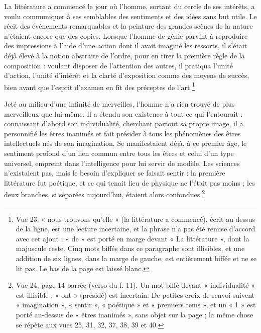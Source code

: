 \documentclass[11pt,a4paper]{article}
\begin{document}
La littérature a commencé le jour où l'homme, sortant du cercle de ses
intérêts, a voulu communiquer à ses semblables des sentiments et des idées sans
but utile. Le récit des événements remarquables et la peinture des grandes
scènes de la nature n'étaient encore que des copies. Lorsque l'homme de génie
parvint à reproduire des impressions à l'aide d'une action dont il avait
imaginé les ressorts, il s'était déjà élevé à la notion abstraite de l'ordre,
pour en tirer la première règle de la composition : voulant disposer de
l'attention des autres, il pratiqua l'unité d'action, l'unité d'intérêt et la
clarté d'exposition comme des moyens de succès, bien avant que l'esprit
d'examen en fît des préceptes de l'art.\footnote{Vue 23. « nous trouvons
qu'elle » (la littérature a commencé), écrit au-dessus de la ligne, est une
lecture incertaine, et la phrase n'a pas été remise d'accord avec cet ajout ;
« de » est porté en marge devant « La littérature », dont la majuscule reste.
Cinq mots biffés dans ce paragraphe sont illisibles, et une addition de six
lignes, dans la marge de gauche, est entièrement biffée et ne se lit pas. Le
bas de la page est laissé blanc.}

Jeté au milieu d'une infinité de merveilles, l'homme n'a rien trouvé de plus
merveilleux que lui-même. Il a étendu son existence à tout ce qui l'entourait :
connaissant d'abord son individualité, cherchant partout sa propre image, il a
personnifié les êtres inanimés et fait présider à tous les phénomènes des êtres
intellectuels nés de son imagination. Se manifestaient déjà, à ce premier âge,
le sentiment profond d'un lien commun entre tous les êtres et celui d'un type
universel, empreint dans l'intelligence pour lui servir de modèle. Les sciences
n'existaient pas, mais le besoin d'expliquer se faisait sentir : la première
littérature fut poétique, et ce qui tenait lieu de physique ne l'était pas
moins ; les deux branches, si séparées aujourd'hui, étaient alors
confondues.\footnote{Vue 24, page 14 barrée (verso du f. 11). Un mot biffé
devant « individualité » est illisible ; « ont » (présidé) est incertain. De
petites croix de renvoi suivent « imagination », « sentir », « poétique » et
« premiers tems », et un « 1 » est porté au-dessus de « êtres inanimés », sans
objet sur la page ; la même chose se répète aux vues 25, 31, 32, 37, 38, 39 et
40.}
\end{document}
